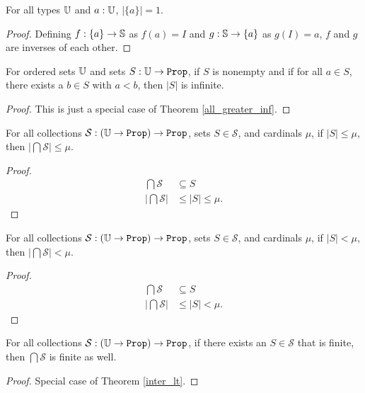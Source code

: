 \documentclass[../../math.tex]{subfiles}
\begin{document}
\begin{theorem} \label{singleton_set_size}
    For all types $\U$ and $a : \U$, $|\{a\}| = 1$.
\end{theorem}
\begin{proof}
    Defining $f : \{a\} \to \S$ as $f(a) = I$ and $g : \S \to \{a\}$ as $g(I) =
    a$, $f$ and $g$ are inverses of each other.
\end{proof}

\begin{theorem} \label{all_greater_inf_set}
    For ordered sets $\U$ and sets $S : \U \to \Prop$, if $S$ is nonempty and if
    for all $a \in S$, there exists a $b \in S$ with $a < b$, then $|S|$ is
    infinite.
\end{theorem}
\begin{proof}
    This is just a special case of Theorem \ref{all_greater_inf}.
\end{proof}

\begin{theorem} \label{inter_le}
    For all collections $\mathcal S : (\U \to \Prop) \to \Prop$, sets $S \in
    \mathcal S$, and cardinals $\mu$, if $|S| \leq \mu$, then $|\bigcap \mathcal
    S| \leq \mu$.
\end{theorem}
\begin{proof}
    \begin{align*}
        \bigcap \mathcal S &\subseteq S \\
        \left|\bigcap \mathcal S\right| &\leq |S| \leq \mu.
    \end{align*}
\end{proof}

\begin{theorem} \label{inter_lt}
    For all collections $\mathcal S : (\U \to \Prop) \to \Prop$, sets $S \in
    \mathcal S$, and cardinals $\mu$, if $|S| < \mu$, then $|\bigcap \mathcal
    S| < \mu$.
\end{theorem}
\begin{proof}
    \begin{align*}
        \bigcap \mathcal S &\subseteq S \\
        \left|\bigcap \mathcal S\right| &\leq |S| < \mu.
    \end{align*}
\end{proof}

\begin{theorem} \label{finite_inter_finite}
    For all collections $\mathcal S : (\U \to \Prop) \to \Prop$, if there exists
    an $S \in \mathcal S$ that is finite, then $\bigcap \mathcal S$ is finite as
    well.
\end{theorem}
\begin{proof}
    Special case of Theorem \ref{inter_lt}.
\end{proof}
\end{document}
